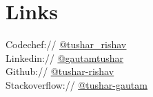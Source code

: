 \documentclass[]{deedy-resume-openfont}
\begin{document}
\begin{minipage}[t]{0.33\textwidth}

\section{Links} 
\textbullet{} Codechef://  \href{https://www.codechef.com/users/tushar_rishav}{\underline {@tushar\_rishav}} \\
\textbullet{} Linkedin:// \href{https://www.linkedin.com/in/gautamtushar}{\underline {@gautamtushar}} \\
\textbullet{} Github:// \href{https://github.com/tushar-rishav}{\underline {@tushar-rishav}} \\
\textbullet{} Stackoverflow:// \href{https://stackoverflow.com/users/3673031/tushar-gautam}{\underline {@tushar-gautam}} \\
\sectionsep

%
%

\end{minipage} 
\hfill
\end{document}
